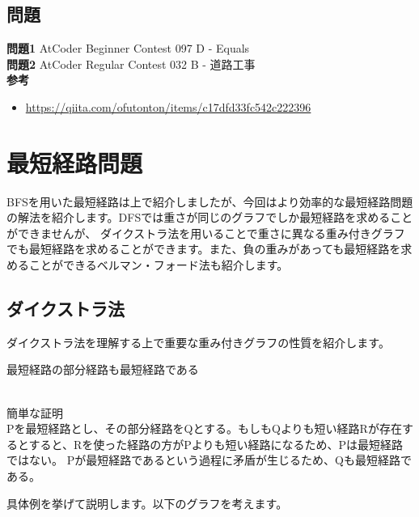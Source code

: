 \documentclass{jlreq}
\begin{document}
\subsection{問題}
\textbf{問題1} AtCoder Beginner Contest 097 D - Equals \\
\textbf{問題2} AtCoder Regular Contest 032 B - 道路工事 \\

\noindent \textbf{参考} \\
\begin{itemize}
  \item \url{https://qiita.com/ofutonton/items/c17dfd33fc542c222396}
\end{itemize}


\newpage
\section{最短経路問題}
BFSを用いた最短経路は上で紹介しましたが、今回はより効率的な最短経路問題の解法を紹介します。DFSでは重さが同じのグラフでしか最短経路を求めることができませんが、
ダイクストラ法を用いることで重さに異なる重み付きグラフでも最短経路を求めることができます。また、負の重みがあっても最短経路を求めることができるベルマン・フォード法も紹介します。

\subsection{ダイクストラ法}
ダイクストラ法を理解する上で重要な重み付きグラフの性質を紹介します。

\begin{theorembox}[経路緩和性]
  最短経路の部分経路も最短経路である


  \dotfill \\
  簡単な証明 \\
  Pを最短経路とし、その部分経路をQとする。もしもQよりも短い経路Rが存在するとすると、Rを使った経路の方がPよりも短い経路になるため、Pは最短経路ではない。
  Pが最短経路であるという過程に矛盾が生じるため、Qも最短経路である。
\end{theorembox}

具体例を挙げて説明します。以下のグラフを考えます。

\vspace{0.5cm}
\end{document}
